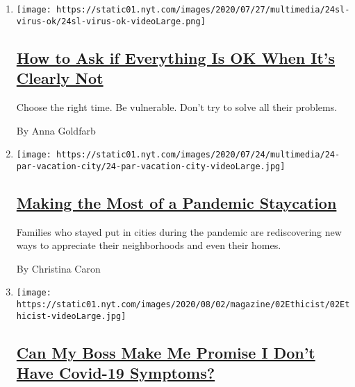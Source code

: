 \begin{enumerate}
\def\labelenumi{\arabic{enumi}.}
\item
  \texttt{[image: https://static01.nyt.com/images/2020/07/27/multimedia/24sl-virus-ok/24sl-virus-ok-videoLarge.png]}

  \hypertarget{how-to-ask-if-everything-is-ok-when-its-clearly-not}{%
  \subsection{\texorpdfstring{\href{/2020/07/28/smarter-living/coronavirus-how-to-check-in-with-a-friend.html}{How
  to Ask if Everything Is OK When It's Clearly
  Not}}{How to Ask if Everything Is OK When It's Clearly Not}}\label{how-to-ask-if-everything-is-ok-when-its-clearly-not}}

  Choose the right time. Be vulnerable. Don't try to solve all their
  problems.

  By Anna Goldfarb
\item
  \texttt{[image: https://static01.nyt.com/images/2020/07/24/multimedia/24-par-vacation-city/24-par-vacation-city-videoLarge.jpg]}

  \hypertarget{making-the-most-of-a-pandemic-staycation}{%
  \subsection{\texorpdfstring{\href{/2020/07/24/parenting/summer-staycation-coronavirus.html}{Making
  the Most of a Pandemic
  Staycation}}{Making the Most of a Pandemic Staycation}}\label{making-the-most-of-a-pandemic-staycation}}

  Families who stayed put in cities during the pandemic are
  rediscovering new ways to appreciate their neighborhoods and even
  their homes.

  By Christina Caron
\item
  \texttt{[image: https://static01.nyt.com/images/2020/08/02/magazine/02Ethicist/02Ethicist-videoLarge.jpg]}

  \hypertarget{can-my-boss-make-me-promise-i-dont-have-covid-19-symptoms}{%
  \subsection{\texorpdfstring{\href{/2020/07/28/magazine/can-my-boss-make-me-promise-i-dont-have-covid-19-symptoms.html}{Can
  My Boss Make Me Promise I Don't Have Covid-19
  Symptoms?}}{Can My Boss Make Me Promise I Don't Have Covid-19 Symptoms?}}\label{can-my-boss-make-me-promise-i-dont-have-covid-19-symptoms}}


\end{enumerate}
